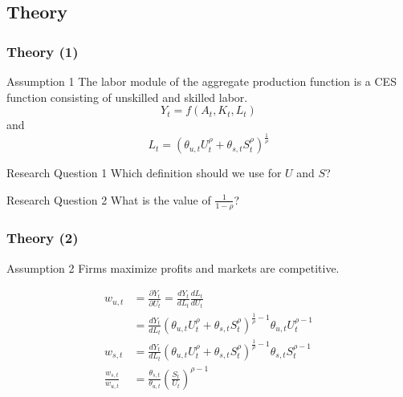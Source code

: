 \documentclass[11pt]{beamer} \usetheme{Frankfurt}
\begin{document}
\subsection{Theory}
\begin{frame}
  \frametitle{Theory (1)}
  \begin{block}{Assumption 1}
    The labor module of the aggregate production function is a CES
    function consisting of unskilled and skilled labor.
    \begin{equation}
      \label{eq:1}
      Y_{t} = f(A_{t},K_{t},L_{t})
    \end{equation}
    and
    \begin{equation}
      \label{eq:2}
      L_{t}=\left( \theta_{u,t}U_{t}^{\rho} + \theta_{s,t}S_{t}^{\rho} \right)^{\frac{1}{\rho}}
    \end{equation}
  \end{block}
  \begin{block}{Research Question 1}
    Which definition should we use for $U$ and $S$?
  \end{block}
  \begin{block}{Research Question 2}
    What is the value of $\frac{1}{1-\rho}$?
  \end{block}
\end{frame}

\begin{frame}
  \frametitle{Theory (2)}
  \begin{block}{Assumption 2}
    Firms maximize profits and markets are competitive.
  \end{block}
  \begin{align}
    \label{eq:3}
    w_{u,t}&=\frac{\partial Y_{t}}{\partial U_{t}}=\frac{d
             Y_{t}}{d L_{t}}\frac{d L_{t}}{d U_{t}} \\
           & = \frac{d Y_{t}}{d L_{t}} \left(
             \theta_{u,t}U_{t}^{\rho} + \theta_{s,t}S_{t}^{\rho}
             \right)^{\frac{1}{\rho}-1}  \theta_{u,t}
             U_{t}^{\rho-1} \\
    w_{s,t} &= \frac{d Y_{t}}{d L_{t}} \left(
              \theta_{u,t}U_{t}^{\rho} + \theta_{s,t}S_{t}^{\rho}
              \right)^{\frac{1}{\rho}-1} 
              \theta_{s,t}S_{t}^{\rho-1} \\
    \frac{w_{s,t}}{w_{u,t}}&= \frac{\theta_{s,t}}{\theta_{u,t}}\left( \frac{S_{t}}{U_{t}} \right)^{\rho-1}
  \end{align}
\end{frame}
\end{document}
